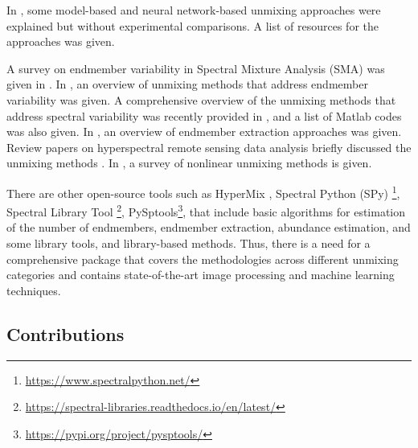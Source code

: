 In \cite{chen_integration_2023}, some model-based and neural network-based unmixing approaches were explained but without experimental comparisons. A list of resources for the approaches was given. 



A survey on endmember variability in Spectral Mixture Analysis (SMA) was given in \cite{somers_endmember_2011}. In \cite{zare_endmember_2013}, an overview of unmixing methods that address endmember variability was given. A comprehensive overview of the unmixing methods that address spectral variability was recently provided in \cite{borsoi_spectral_2021}, and a list of Matlab codes was also given. In \cite{plaza_recent_2011}, an overview of endmember extraction approaches was given. Review papers on hyperspectral remote sensing data analysis briefly discussed the unmixing methods \cite{bioucas-dias_hyperspectral_2013, ghamisi_advances_2017}. In \cite{heylen_review_2014}, a survey of nonlinear unmixing methods is given.


There are other open-source tools such as HyperMix \cite{jimenez_hypermix_2015}, Spectral Python (SPy) \footnote{\href{https://www.spectralpython.net/}{https://www.spectralpython.net/}}, Spectral Library Tool \footnote{\href{https://spectral-libraries.readthedocs.io/en/latest/}{https://spectral-libraries.readthedocs.io/en/latest/}}, PySptools\footnote{\href{https://pypi.org/project/pysptools/}{https://pypi.org/project/pysptools/}}, that include basic algorithms for estimation of the number of endmembers, endmember extraction, abundance estimation, and some library tools, and library-based methods. Thus, there is a need for a comprehensive package that covers the methodologies across different unmixing categories and contains state-of-the-art image processing and machine learning techniques. 

\subsection{Contributions}


